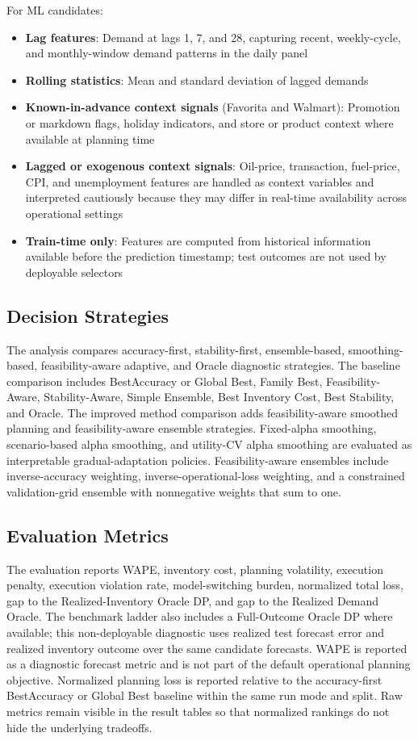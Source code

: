 For ML candidates:
\begin{itemize}
    \item \textbf{Lag features}: Demand at lags 1, 7, and 28, capturing recent, weekly-cycle, and monthly-window demand patterns in the daily panel
    \item \textbf{Rolling statistics}: Mean and standard deviation of lagged demands
    \item \textbf{Known-in-advance context signals} (Favorita and Walmart): Promotion or markdown flags, holiday indicators, and store or product context where available at planning time
    \item \textbf{Lagged or exogenous context signals}: Oil-price, transaction, fuel-price, CPI, and unemployment features are handled as context variables and interpreted cautiously because they may differ in real-time availability across operational settings
    \item \textbf{Train-time only}: Features are computed from historical information available before the prediction timestamp; test outcomes are not used by deployable selectors
\end{itemize}

\subsection{Decision Strategies}

The analysis compares accuracy-first, stability-first, ensemble-based, smoothing-based, feasibility-aware adaptive, and Oracle diagnostic strategies. The baseline comparison includes BestAccuracy or Global Best, Family Best, Feasibility-Aware, Stability-Aware, Simple Ensemble, Best Inventory Cost, Best Stability, and Oracle. The improved method comparison adds feasibility-aware smoothed planning and feasibility-aware ensemble strategies. Fixed-alpha smoothing, scenario-based alpha smoothing, and utility-CV alpha smoothing are evaluated as interpretable gradual-adaptation policies. Feasibility-aware ensembles include inverse-accuracy weighting, inverse-operational-loss weighting, and a constrained validation-grid ensemble with nonnegative weights that sum to one.

\subsection{Evaluation Metrics}

The evaluation reports WAPE, inventory cost, planning volatility, execution penalty, execution violation rate, model-switching burden, normalized total loss, gap to the Realized-Inventory Oracle DP, and gap to the Realized Demand Oracle. The benchmark ladder also includes a Full-Outcome Oracle DP where available; this non-deployable diagnostic uses realized test forecast error and realized inventory outcome over the same candidate forecasts. WAPE is reported as a diagnostic forecast metric and is not part of the default operational planning objective. Normalized planning loss is reported relative to the accuracy-first BestAccuracy or Global Best baseline within the same run mode and split. Raw metrics remain visible in the result tables so that normalized rankings do not hide the underlying tradeoffs.

